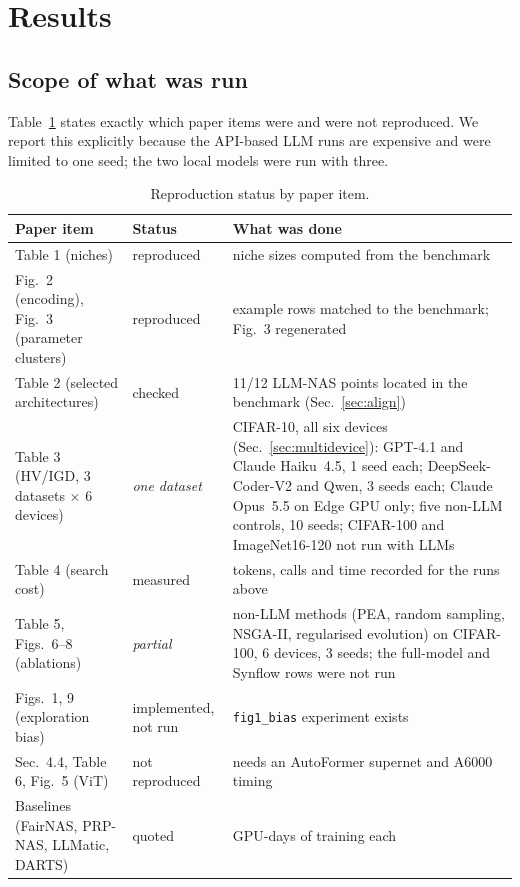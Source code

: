 \documentclass[pdflatex,sn-mathphys-num]{sn-jnl}
\newcommand{\code}[1]{\texttt{#1}}
\begin{document}
\section{Results}\label{sec:results}

\subsection{Scope of what was run}
Table~\ref{tab:scope} states exactly which paper items were and were not reproduced. We report this explicitly because the API-based LLM runs are expensive and were limited to one seed; the two local models were run with three.
\begin{table}[h]\centering\footnotesize\setlength{\tabcolsep}{3pt}
\caption{Reproduction status by paper item.}\label{tab:scope}
\begin{tabular}{p{3.4cm}p{1.8cm}p{6.3cm}}
\toprule
Paper item & Status & What was done \\
\midrule
Table 1 (niches) & reproduced & niche sizes computed from the benchmark \\
Fig.~2 (encoding), Fig.~3 (parameter clusters) & reproduced & example rows matched to the benchmark; Fig.~3 regenerated \\
Table 2 (selected architectures) & checked & 11/12 LLM-NAS points located in the benchmark (Sec.~\ref{sec:align}) \\
Table 3 (HV/IGD, 3 datasets $\times$ 6 devices) & \emph{one dataset} & CIFAR-10, all six devices (Sec.~\ref{sec:multidevice}): GPT-4.1 and Claude Haiku~4.5, 1 seed each; DeepSeek-Coder-V2 and Qwen, 3 seeds each; Claude Opus~5.5 on Edge GPU only; five non-LLM controls, 10 seeds; CIFAR-100 and ImageNet16-120 not run with LLMs \\
Table 4 (search cost) & measured & tokens, calls and time recorded for the runs above \\
Table 5, Figs.~6--8 (ablations) & \emph{partial} & non-LLM methods (PEA, random sampling, NSGA-II, regularised evolution) on CIFAR-100, 6 devices, 3 seeds; the full-model and Synflow rows were not run \\
Figs.~1, 9 (exploration bias) & implemented, not run & \code{fig1\_bias} experiment exists \\
Sec.~4.4, Table 6, Fig.~5 (ViT) & not reproduced & needs an AutoFormer supernet and A6000 timing \\
Baselines (FairNAS, PRP-NAS, LLMatic, DARTS) & quoted & GPU-days of training each \\
\bottomrule
\end{tabular}
\end{table}
\end{document}
